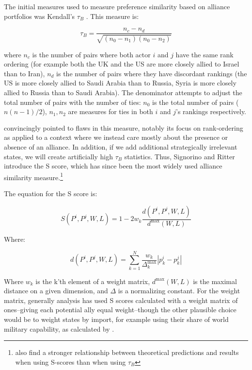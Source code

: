  The initial measures used to measure preference similarity based on alliance portfolios was Kendall's $\tau_{B}$ \citet{bdm:lalman:1992}. This measure is:
 
 \begin{equation}
	 \tau_{B} = \frac{n_{c} - n_{d}}{\sqrt{(n_{0} - n_{1})(n_{0} - n_{2})}}
 \end{equation}
 
 where $n_{c}$ is the number of pairs where both actor $i$ and $j$ have the same rank ordering (for example both the UK and the US are more closely allied to Israel than to Iran), $n_{d}$ is the number of pairs where they have discordant rankings (the US is more closely allied to Saudi Arabia than to Russia, Syria is more closely allied to Russia than to Saudi Arabia). The denominator attempts to adjust the total number of pairs with the number of ties: $n_{0}$ is the total number of pairs ($n(n-1)/2$), $n_{1}, n_{2}$ are measures for ties in both $i$ and $j$'s rankings respectively.
 
\citet{signorino:ritter:1999} convincingly pointed to flaws in this measure, notably its focus on rank-ordering as applied to a context where we instead care mostly about the presence or absence of an alliance. In addition, if we add additional strategically irrelevant states, we will create artificially high $\tau_{B}$ statistics. Thus, Signorino and Ritter introduce the S score, which has since been the most widely used alliance similarity measure.\footnote{\citep{bennett:rupert:2003} also find a stronger relationship between theoretical predictions and results when using S-scores than when using $\tau_{B}$}

The equation for the S score is:

\begin{equation}
	S(P^i, P^j, W, L) = 1 - 2w_k \frac{d(P^i, P^j, W, L)}{d^{\text{max}}(W,L)}
\end{equation}

Where:

\begin{equation}
	d(P^i, P^j, W, L) = \sum_{k = 1}^N \frac{w_k}{\Delta^\text{max}_{k}} |p^i_k - p^j_k|
\end{equation}

Where $w_k$ is the k'th element of a weight matrix, $d^\text{max}(W,L)$ is the maximal distance on a given dimension, and $\Delta$ is a normalizing constant. For the weight matrix, generally analysis has used S scores calculated with a weight matrix of ones--giving each potential ally equal weight--though the other plausible choice would be to weight states by import, for example using their share of world military capability, as calculated by \citet{singer:small:1995}.


